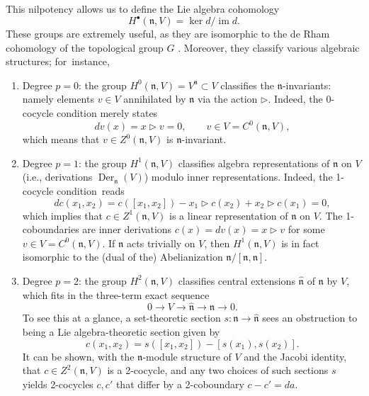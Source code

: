 \documentclass[onecolumn]{article}
\theoremstyle{theorem}
\theoremstyle{remark}
\theoremstyle{example}
\theoremstyle{definition}
\numberwithin{equation}{section}
\begin{document}
This nilpotency allows us to define the { {Lie algebra cohomology}}
\begin{equation}
    H^\bullet(\mathfrak{n},V) = \operatorname{ker}d/\operatorname{im}d.\nonumber
\end{equation}
{These} groups are extremely useful, as they are isomorphic to the de Rham cohomology of the topological group $G$ \cite{book-loop}. Moreover, they classify various algebraic structures; for~instance,
\begin{enumerate}
    \item { {Degree $p=0$}}: the group $H^0(\mathfrak{n},V) = V^{\mathfrak{n}}\subset V$ classifies the $\mathfrak{n}$-invariants: namely elements $v\in V$ annihilated by $\mathfrak{n}$ via the action $\rhd$. Indeed, the 0-cocycle condition merely states
    \begin{equation}
        dv(x) = x\rhd v = 0,\qquad v\in V=C^0(\mathfrak{n},V),\nonumber
    \end{equation}
    which means that $v\in Z^0(\mathfrak{n},V)$ is $\mathfrak{n}$-invariant.
    \item { {Degree $p=1$}}: the group $H^1(\mathfrak{n},V)$ classifies algebra representations of $\mathfrak{n}$ on $V$ (i.e., derivations $\operatorname{Der}_\mathfrak{n}(V)$) modulo inner representations. Indeed, the 1-cocycle condition~reads
    \begin{equation}
        dc(x_1,x_2) = c([x_1,x_2]) - x_1\rhd c(x_2) + x_2\rhd c(x_1) = 0,\nonumber
    \end{equation}
    which implies that $c\in Z^1(\mathfrak{n},V)$ is a linear representation of $\mathfrak{n}$ on $V$. The 1-coboundaries are inner derivations $c(x) = dv(x) = x\rhd v$ for some $v\in V=C^0(\mathfrak{n},V)$. If $\mathfrak{n}$ acts trivially on $V$, then $H^1(\mathfrak{n},V)$ is in fact isomorphic to the (dual of the) Abelianization $\mathfrak{n}/[\mathfrak{n},\mathfrak{n}]$.
    \item { {Degree $p=2$}}: the group $H^2(\mathfrak{n},V)$ classifies { {central extensions}} $\widehat{\mathfrak{n}}$ of $\mathfrak{n}$ by $V$, which fits in the three-term exact sequence
    \begin{equation}
        0\rightarrow V\rightarrow \widehat{\mathfrak{n}}\rightarrow\mathfrak{n}\rightarrow 0.\nonumber
    \end{equation}
    To see this at a glance, a { {set-theoretic}} section $s:\mathfrak{n}\rightarrow\widehat{\mathfrak{n}}$ sees an obstruction to being a { {Lie algebra-theoretic}} section given by
    \begin{equation}
        c(x_1,x_2) = s([x_1,x_2]) - [s(x_1),s(x_2)].\nonumber
    \end{equation}
    It can be shown, with the $\mathfrak{n}$-module structure of $V$ and the Jacobi identity, that \linebreak$c\in Z^2(\mathfrak{n},V)$ is a 2-cocycle, and any two choices of such sections $s$ yields 2-cocycles $c,c'$ that differ by a 2-coboundary $c-c'=da$.
\end{enumerate}
\end{document}
